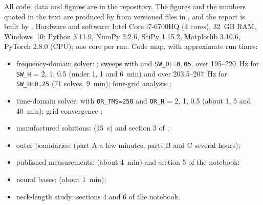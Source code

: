 \documentclass[11pt,a4paper]{article}
\begin{document}
All code, data and figures are in the repository. The figures and the numbers quoted in the
text are produced by  from versioned files in
, and the report is built by . Hardware and
software: Intel Core i7-6700HQ (4 cores), 32~GB RAM, Windows~10; Python 3.11.9, NumPy 2.2.6,
SciPy 1.15.2, Matplotlib 3.10.6, PyTorch 2.8.0 (CPU); one core per run. Code map, with
approximate run times:
\begin{itemize}\itemsep0pt
  \item frequency-domain solver: ; sweeps with
     and \texttt{SW\_DF=0.05}, over 195--220~Hz for
    \texttt{SW\_H} = 2, 1, 0.5 (under 1, 1 and 6~min) and over 203.5--207~Hz for
    \texttt{SW\_H=0.25} (71 solves, 9~min); four-grid analysis
    ;
  \item time-domain solver:  with \texttt{OR\_TMS=250} and
    \texttt{OR\_H} = 2, 1, 0.5 (about 1, 5 and 40~min); grid convergence
    ;
  \item manufactured solutions:  (15~s) and section 3
    of ;
  \item outer boundaries:  (part A a few minutes,
    parts B and C several hours);
  \item published measurements:  (about
    4~min) and section 5 of the notebook;
  \item neural bases:  (about 1~min);
  \item neck-length study: sections 4 and 6 of the notebook.
\end{itemize}



\end{document}
